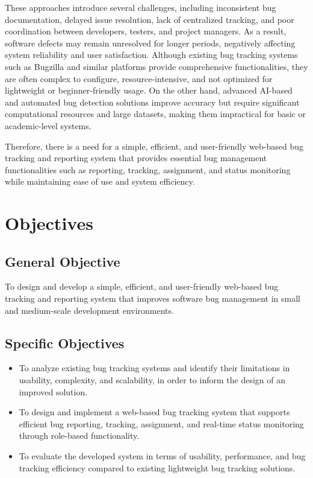 \documentclass[12pt]{article}
\begin{document}
These approaches introduce several challenges, including inconsistent bug documentation, delayed issue resolution, lack of centralized tracking, and poor coordination between developers, testers, and project managers. As a result, software defects may remain unresolved for longer periods, negatively affecting system reliability and user satisfaction.
 Although existing bug tracking systems such as Bugzilla and similar platforms provide comprehensive functionalities, they are often complex to configure, resource-intensive, and not optimized for lightweight or beginner-friendly usage. On the other hand, advanced AI-based and automated bug detection solutions improve accuracy but require significant computational resources and large datasets, making them impractical for basic or academic-level systems.

Therefore, there is a need for a simple, efficient, and user-friendly web-based bug tracking and reporting system that provides essential bug management functionalities such as reporting, tracking, assignment, and status monitoring while maintaining ease of use and system efficiency.


\section{Objectives}

\subsection{General Objective}
To design and develop a simple, efficient, and user-friendly web-based bug tracking and reporting system that improves software bug management in small and medium-scale development environments.

\subsection{Specific Objectives}

\begin{itemize}
    \item To analyze existing bug tracking systems and identify their limitations in usability, complexity, and scalability, in order to inform the design of an improved solution.

    \item To design and implement a web-based bug tracking system that supports efficient bug reporting, tracking, assignment, and real-time status monitoring through role-based functionality.

    \item To evaluate the developed system in terms of usability, performance, and bug tracking efficiency compared to existing lightweight bug tracking solutions.
\end{itemize}
\end{document}
